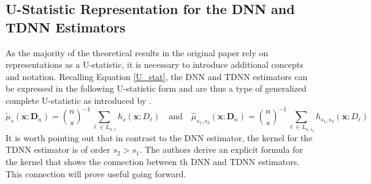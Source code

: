 \documentclass[letterpaper,10pt]{article}
\numberwithin{equation}{section}
\numberwithin{thm}{section}
\newtheorem{dfn}{Definition}
\numberwithin{lem}{section}
\numberwithin{cor}{section}
\renewcommand{\hat}{\widehat}
\newcommand{\E}{\mathbb{E}}
\newcommand{\1}{\mathbbm{1}}
\begin{document}
\subsection{U-Statistic Representation for the DNN and TDNN Estimators}
As the majority of the theoretical results in the original paper rely on representations as a U-statistic, it is necessary to introduce additional concepts and notation.
Recalling Equation \ref{U_stat}, the DNN and TDNN estimators can be expressed in the following U-statistic form and are thus a type of generalized complete U-statistic as introduced by \citet{peng_rates_2022}.
\begin{equation}
	\tilde{\mu}_{s}(\mathbf{x}; \mathbf{D}_n)
	= \binom{n}{s}^{-1} \sum_{\ell \in L_{n,s}} h_{s}(\mathbf{x}; D_{\ell})
	\quad \text{and} \quad
	\hat{\mu}_{s_1, s_2}(\mathbf{x}; \mathbf{D}_n)
	= \binom{n}{s}^{-1} \sum_{\ell \in L_{n,s_2}} h_{s_1, s_2}(\mathbf{x}; D_{\ell})
\end{equation}
It is worth pointing out that in contrast to the DNN estimator, the kernel for the TDNN estimator is of order $s_2 > s_1$.
The authors derive an explicit formula for the kernel that shows the connection between th DNN and TDNN estimators.
This connection will prove useful going forward.
\end{document}
